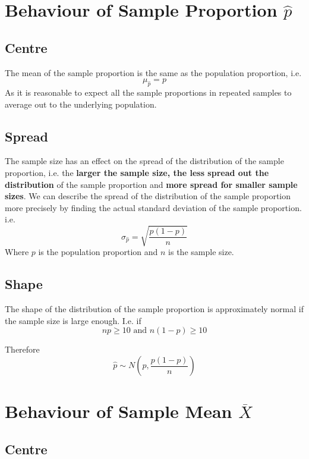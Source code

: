 \documentclass[12pt letter]{report}
\begin{document}
\section{Behaviour of Sample Proportion $\hat{p}$}

\subsection{Centre}

The mean of the sample proportion is the same as the population proportion, i.e.
\[
  \mu_{\hat{p}} = p
\]
As it is reasonable to expect all the sample proportions in repeated samples to average out to the underlying population.

\subsection{Spread}

The sample size has an effect on the spread of the distribution of the sample proportion, i.e. the \textbf{larger the sample
  size, the less spread out the distribution} of the sample proportion and \textbf{more spread for smaller sample
  sizes}. We can describe the spread of the distribution of the sample proportion more precisely by finding the actual
standard deviation of the sample proportion. i.e.
\[
  \sigma_{\hat{p}} = \sqrt{\frac{p \left( 1 - p \right) }{n}}
\]
Where $p$ is the population proportion and $n$ is the sample size.

\subsection{Shape}

The shape of the distribution of the sample proportion is approximately normal if the sample size is large enough. I.e.
if
\[
  np \geq 10 \text{ and } n \left( 1 - p \right) \geq 10
\]

Therefore
\[
  \hat{p} \sim N \left( p, \frac{p \left( 1 - p \right) }{n} \right)
\]


\section{Behaviour of Sample Mean $\overline{X}$}

\subsection{Centre}
\end{document}

